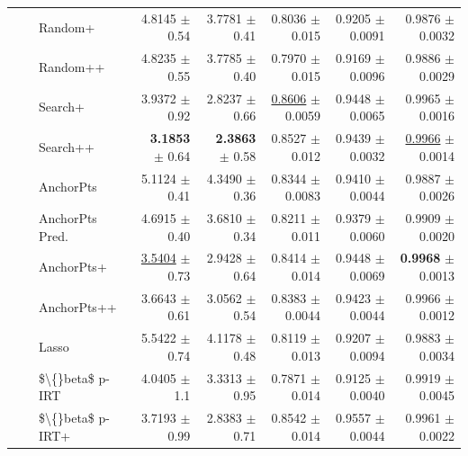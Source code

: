\begin{longtable}{llp{}rrrrr}
 &  & Random+ & 4.8145 {\scriptsize $\pm$ 0.54} & 3.7781 {\scriptsize $\pm$ 0.41} & 0.8036 {\scriptsize $\pm$ 0.015} & 0.9205 {\scriptsize $\pm$ 0.0091} & 0.9876 {\scriptsize $\pm$ 0.0032} \\
 &  & Random++ & 4.8235 {\scriptsize $\pm$ 0.55} & 3.7785 {\scriptsize $\pm$ 0.40} & 0.7970 {\scriptsize $\pm$ 0.015} & 0.9169 {\scriptsize $\pm$ 0.0096} & 0.9886 {\scriptsize $\pm$ 0.0029} \\
 &  & Search+ & 3.9372 {\scriptsize $\pm$ 0.92} & 2.8237 {\scriptsize $\pm$ 0.66} & \underline{0.8606} {\scriptsize $\pm$ 0.0059} & 0.9448 {\scriptsize $\pm$ 0.0065} & 0.9965 {\scriptsize $\pm$ 0.0016} \\
 &  & Search++ & \textbf{3.1853} {\scriptsize $\pm$ 0.64} & \textbf{2.3863} {\scriptsize $\pm$ 0.58} & 0.8527 {\scriptsize $\pm$ 0.012} & 0.9439 {\scriptsize $\pm$ 0.0032} & \underline{0.9966} {\scriptsize $\pm$ 0.0014} \\
 &  & AnchorPts & 5.1124 {\scriptsize $\pm$ 0.41} & 4.3490 {\scriptsize $\pm$ 0.36} & 0.8344 {\scriptsize $\pm$ 0.0083} & 0.9410 {\scriptsize $\pm$ 0.0044} & 0.9887 {\scriptsize $\pm$ 0.0026} \\
 &  & AnchorPts Pred. & 4.6915 {\scriptsize $\pm$ 0.40} & 3.6810 {\scriptsize $\pm$ 0.34} & 0.8211 {\scriptsize $\pm$ 0.011} & 0.9379 {\scriptsize $\pm$ 0.0060} & 0.9909 {\scriptsize $\pm$ 0.0020} \\
 &  & AnchorPts+ & \underline{3.5404} {\scriptsize $\pm$ 0.73} & 2.9428 {\scriptsize $\pm$ 0.64} & 0.8414 {\scriptsize $\pm$ 0.014} & 0.9448 {\scriptsize $\pm$ 0.0069} & \textbf{0.9968} {\scriptsize $\pm$ 0.0013} \\
 &  & AnchorPts++ & 3.6643 {\scriptsize $\pm$ 0.61} & 3.0562 {\scriptsize $\pm$ 0.54} & 0.8383 {\scriptsize $\pm$ 0.0044} & 0.9423 {\scriptsize $\pm$ 0.0044} & 0.9966 {\scriptsize $\pm$ 0.0012} \\
 &  & Lasso & 5.5422 {\scriptsize $\pm$ 0.74} & 4.1178 {\scriptsize $\pm$ 0.48} & 0.8119 {\scriptsize $\pm$ 0.013} & 0.9207 {\scriptsize $\pm$ 0.0094} & 0.9883 {\scriptsize $\pm$ 0.0034} \\
 &  & \$\textbackslash\{\}beta\$ p-IRT & 4.0405 {\scriptsize $\pm$ 1.1} & 3.3313 {\scriptsize $\pm$ 0.95} & 0.7871 {\scriptsize $\pm$ 0.014} & 0.9125 {\scriptsize $\pm$ 0.0040} & 0.9919 {\scriptsize $\pm$ 0.0045} \\
 &  & \$\textbackslash\{\}beta\$ p-IRT+ & 3.7193 {\scriptsize $\pm$ 0.99} & 2.8383 {\scriptsize $\pm$ 0.71} & 0.8542 {\scriptsize $\pm$ 0.014} & 0.9557 {\scriptsize $\pm$ 0.0044} & 0.9961 {\scriptsize $\pm$ 0.0022} \\

\end{longtable}
